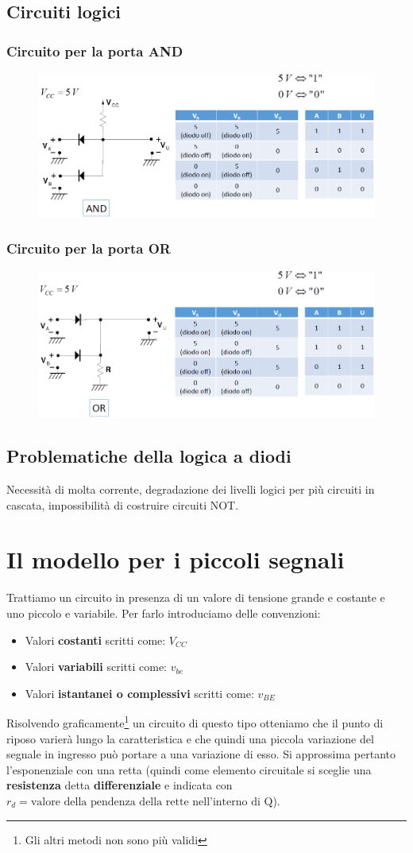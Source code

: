 \documentclass[11pt,a4paper,]{article}
\begin{document}
\subsection{Circuiti logici}
\subsubsection{Circuito per la porta AND}
\begin{figure}[H]
    \centering
    \includegraphics[width=0.5\linewidth]{img/circ and.png}
\end{figure}
\subsubsection{Circuito per la porta OR}
\begin{figure}[H]
    \centering
    \includegraphics[width=0.5\linewidth]{img/circ or.png}
\end{figure}
\subsection{Problematiche della logica a diodi}
Necessità di molta corrente, degradazione dei livelli logici per più circuiti in cascata, impossibilità di costruire circuiti NOT.

\section{Il modello per i piccoli segnali}
Trattiamo un circuito in presenza di un valore di tensione grande e costante e uno piccolo e variabile.
Per farlo introduciamo delle convenzioni:
\begin{itemize}
    \item Valori \textbf{costanti} scritti come: $V_{CC}$
    \item Valori \textbf{variabili} scritti come: $v_{be}$
    \item Valori \textbf{istantanei o complessivi} scritti come: $v_{BE}$
\end{itemize}
Risolvendo graficamente\footnote{Gli altri metodi non sono più validi} un circuito di questo tipo otteniamo che il punto di riposo varierà lungo la caratteristica e che quindi una piccola variazione del segnale in ingresso può portare a una variazione di esso.
Si approssima pertanto l'esponenziale con una retta (quindi come elemento circuitale si sceglie una \textbf{resistenza} detta \textbf{differenziale} e indicata con $r_d=\text{valore della pendenza della rette nell'interno di Q}$).
\end{document}
